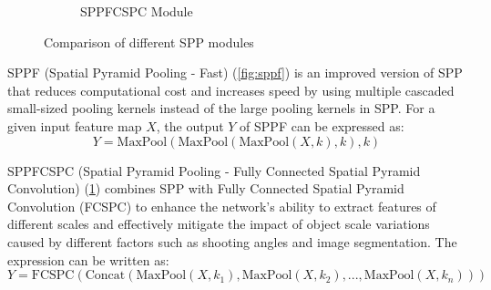 \documentclass[10pt]{article}
\begin{document}
\begin{figure}[H]
\begin{subfigure}[b]{0.32\textwidth}
        \caption{SPPFCSPC Module}
        \label{fig:sppfcspc}
    \end{subfigure}
    \caption{Comparison of different SPP modules}
    \label{fig:spp_family}
\end{figure}
SPPF (Spatial Pyramid Pooling - Fast) (\ref{fig:sppf}) is an improved version of SPP that reduces computational cost and increases speed by using multiple cascaded small-sized pooling kernels instead of the large pooling kernels in SPP.
For a given input feature map $X$, the output $Y$ of SPPF can be expressed as:
\begin{equation}
  Y = \text{MaxPool}(\text{MaxPool}(\text{MaxPool}(X, k),k), k)
  \label{eq:sppf}
\end{equation}

SPPFCSPC (Spatial Pyramid Pooling - Fully Connected Spatial Pyramid Convolution) (\ref{fig:sppfcspc}) combines SPP with Fully Connected Spatial Pyramid Convolution (FCSPC) to enhance the network's ability to extract features of different scales and effectively mitigate the impact of object scale variations caused by different factors such as shooting angles and image segmentation.
The expression can be written as:
\begin{equation}
  Y = \text{FCSPC}(\text{Concat}(\text{MaxPool}(X, k_1), \text{MaxPool}(X, k_2), ..., \text{MaxPool}(X, k_n)))
  \label{eq:sppfcspc}
\end{equation}
\end{document}
